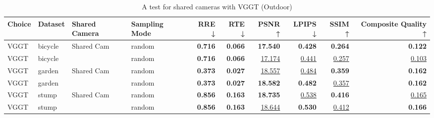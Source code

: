 \begin{table}[H]
\caption{A test for shared cameras with VGGT (Outdoor)}
\label{tab:06_shared_camera_vggt_outdoor}
\footnotesize
\begin{tabular}{llllrrrrrr}
\toprule
Choice & Dataset & Shared Camera & Sampling Mode & RRE ↓ & RTE ↓ & PSNR ↑ & LPIPS ↓ & SSIM ↑ & Composite Quality ↑ \\
\midrule
VGGT & bicycle & Shared Cam & random & \textbf{0.716} & \textbf{0.066} & \textbf{17.540} & \textbf{0.428} & \textbf{0.264} & \textbf{0.122} \\
VGGT & bicycle &  & random & \textbf{0.716} & \textbf{0.066} & \underline{17.174} & \underline{0.441} & \underline{0.257} & \underline{0.103} \\
\midrule
VGGT & garden & Shared Cam & random & \textbf{0.373} & \textbf{0.027} & \underline{18.557} & \underline{0.484} & \textbf{0.359} & \textbf{0.162} \\
VGGT & garden &  & random & \textbf{0.373} & \textbf{0.027} & \textbf{18.582} & \textbf{0.482} & \underline{0.357} & \textbf{0.162} \\
\midrule
VGGT & stump & Shared Cam & random & \textbf{0.856} & \textbf{0.163} & \textbf{18.735} & \underline{0.538} & \textbf{0.416} & \underline{0.165} \\
VGGT & stump &  & random & \textbf{0.856} & \textbf{0.163} & \underline{18.644} & \textbf{0.530} & \underline{0.412} & \textbf{0.166} \\
\bottomrule
\end{tabular}
\end{table}